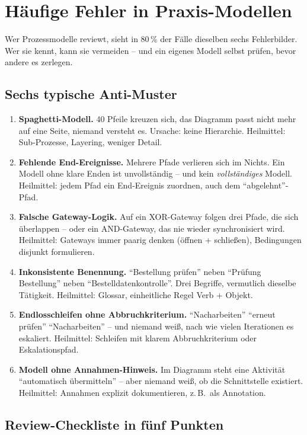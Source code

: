\documentclass[11pt,a4paper,oneside]{article}
\newcommand{\fachbegriff}[1]{\textbf{#1}}
\begin{document}
\section{Häufige Fehler in Praxis-Modellen}

Wer Prozessmodelle reviewt, sieht in 80\,\% der Fälle dieselben sechs Fehlerbilder. Wer sie kennt, kann sie vermeiden -- und ein eigenes Modell selbst prüfen, bevor andere es zerlegen.

\subsection{Sechs typische Anti-Muster}

\begin{enumerate}
  \item \fachbegriff{Spaghetti-Modell.} 40 Pfeile kreuzen sich, das Diagramm passt nicht mehr auf eine Seite, niemand versteht es. Ursache: keine Hierarchie. Heilmittel: Sub-Prozesse, Layering, weniger Detail.
  \item \fachbegriff{Fehlende End-Ereignisse.} Mehrere Pfade verlieren sich im Nichts. Ein Modell ohne klare Enden ist unvollständig -- und kein \emph{vollständiges} Modell. Heilmittel: jedem Pfad ein End-Ereignis zuordnen, auch dem ``abgelehnt''-Pfad.
  \item \fachbegriff{Falsche Gateway-Logik.} Auf ein XOR-Gateway folgen drei Pfade, die sich überlappen -- oder ein AND-Gateway, das nie wieder synchronisiert wird. Heilmittel: Gateways immer paarig denken (öffnen + schließen), Bedingungen disjunkt formulieren.
  \item \fachbegriff{Inkonsistente Benennung.} ``Bestellung prüfen'' neben ``Prüfung Bestellung'' neben ``Bestelldatenkontrolle''. Drei Begriffe, vermutlich dieselbe Tätigkeit. Heilmittel: Glossar, einheitliche Regel Verb + Objekt.
  \item \fachbegriff{Endlosschleifen ohne Abbruchkriterium.} ``Nacharbeiten'' \textrightarrow{} ``erneut prüfen'' \textrightarrow{} ``Nacharbeiten'' -- und niemand weiß, nach wie vielen Iterationen es eskaliert. Heilmittel: Schleifen mit klarem Abbruchkriterium oder Eskalationspfad.
  \item \fachbegriff{Modell ohne Annahmen-Hinweis.} Im Diagramm steht eine Aktivität ``automatisch übermitteln'' -- aber niemand weiß, ob die Schnittstelle existiert. Heilmittel: Annahmen explizit dokumentieren, z.\,B.\ als Annotation.
\end{enumerate}

\subsection{Review-Checkliste in fünf Punkten}
\end{document}
